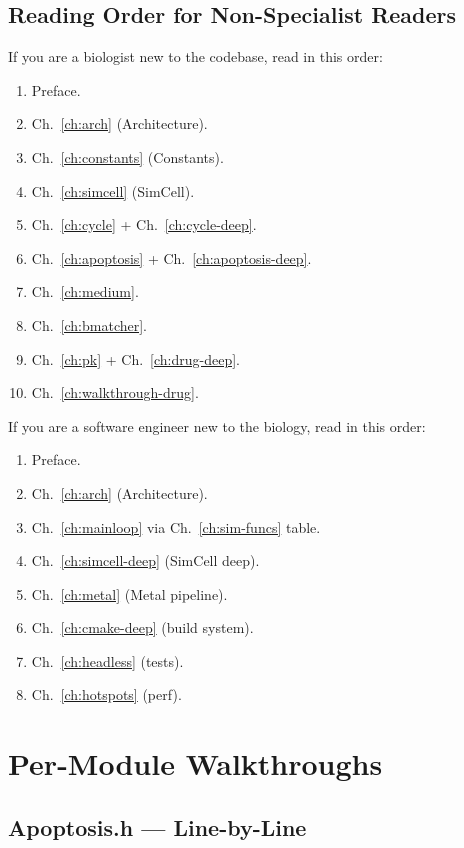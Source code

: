\documentclass[11pt,letterpaper,twoside,openany]{book}
\begin{document}
\chapter{Reading Order for Non-Specialist Readers}
\label{ch:reading-order}

If you are a biologist new to the codebase, read in this order:
\begin{enumerate}
  \item Preface.
  \item Ch.~\ref{ch:arch} (Architecture).
  \item Ch.~\ref{ch:constants} (Constants).
  \item Ch.~\ref{ch:simcell} (SimCell).
  \item Ch.~\ref{ch:cycle} + Ch.~\ref{ch:cycle-deep}.
  \item Ch.~\ref{ch:apoptosis} + Ch.~\ref{ch:apoptosis-deep}.
  \item Ch.~\ref{ch:medium}.
  \item Ch.~\ref{ch:bmatcher}.
  \item Ch.~\ref{ch:pk} + Ch.~\ref{ch:drug-deep}.
  \item Ch.~\ref{ch:walkthrough-drug}.
\end{enumerate}

If you are a software engineer new to the biology, read in this order:
\begin{enumerate}
  \item Preface.
  \item Ch.~\ref{ch:arch} (Architecture).
  \item Ch.~\ref{ch:mainloop} via Ch.~\ref{ch:sim-funcs} table.
  \item Ch.~\ref{ch:simcell-deep} (SimCell deep).
  \item Ch.~\ref{ch:metal} (Metal pipeline).
  \item Ch.~\ref{ch:cmake-deep} (build system).
  \item Ch.~\ref{ch:headless} (tests).
  \item Ch.~\ref{ch:hotspots} (perf).
\end{enumerate}

\part{Per-Module Walkthroughs}

\chapter{Apoptosis.h --- Line-by-Line}
\label{ch:apo-line}
\end{document}
